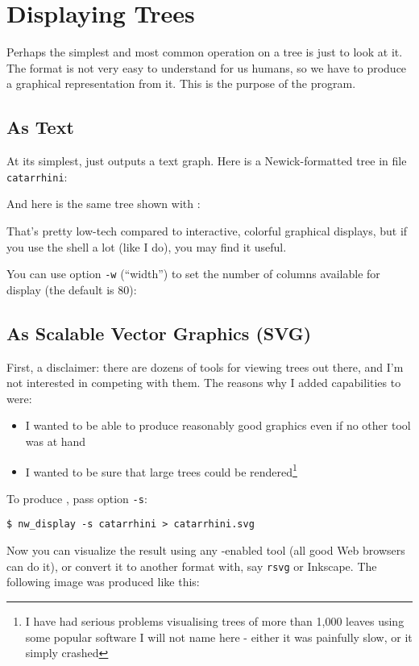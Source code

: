 
\section{Displaying Trees}
\label{sct_display}

Perhaps the simplest and most common operation on a \nw{} tree is just to look
at it. The \nw{} format is not very easy to understand for us humans, so we
have to produce a graphical representation from it. This is the purpose of the
\display{} program. 

\subsection{As Text}
\label{sct_display_text}

At its simplest, \display{} just outputs a text graph. Here is a
Newick-formatted tree in file \texttt{catarrhini}:

And here is the same tree shown with \display{}:

\begin{samepage}

\end{samepage}
That's pretty low-tech compared to interactive, colorful graphical displays,
but if you use the shell a lot (like I do), you may find it useful.

You can use option \texttt{-w} (``width'') to set the number of columns
available for display (the default is 80):


\begin{samepage}

\end{samepage}

\subsection{As Scalable Vector Graphics (SVG)}
\label{sct_display_svg}

First, a disclaimer: there are dozens of tools for viewing trees out there, and
I'm not interested in competing with them. The reasons why I added \svg{}
capabilities to \display{} were:
\begin{itemize}
\item I wanted to be able to produce reasonably good graphics even if no other
tool was at hand
\item I wanted to be sure that large trees could be rendered\footnote{I have had serious problems
visualising trees of more than 1,000 leaves using some popular software I will
not name here - either it was painfully slow, or it simply crashed}
\end{itemize}
To produce \svg, pass option \texttt{-s}:
\begin{verbatim}
$ nw_display -s catarrhini > catarrhini.svg
\end{verbatim}
Now you can visualize the result using any \svg-enabled tool (all good Web browsers can do it), or convert it to another format with, say \texttt{rsvg} or Inkscape. The following \pdf{} image was produced like this:

